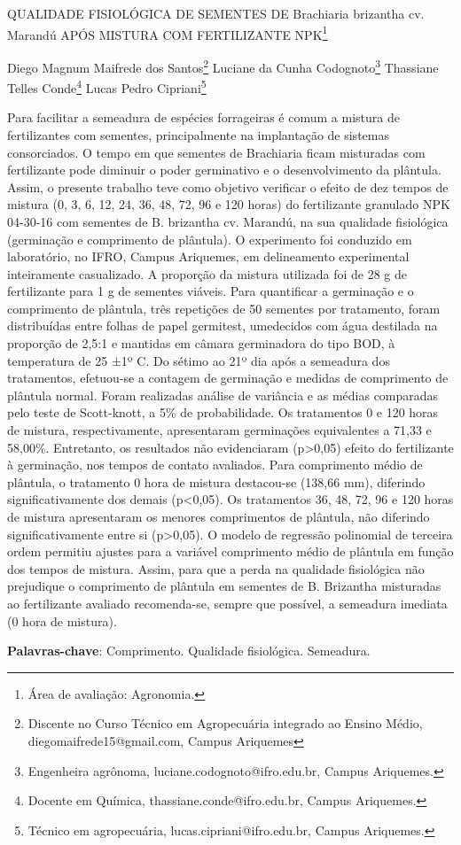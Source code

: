 \documentclass[article,12pt,onesidea,4paper,english,brazil]{abntex2}
\begin{document}
	
	
	\frenchspacing 
	
	\begin{center}
		\LARGE QUALIDADE FISIOLÓGICA DE SEMENTES DE Brachiaria brizantha cv. Marandú APÓS MISTURA COM FERTILIZANTE NPK\footnote{Área de avaliação: Agronomia.}
		
		\normalsize
	Diego Magnum Maifrede dos Santos\footnote{Discente no Curso Técnico em Agropecuária integrado ao Ensino Médio, diegomaifrede15@gmail.com, Campus Ariquemes} 
	Luciane da Cunha Codognoto\footnote{Engenheira agrônoma, luciane.codognoto@ifro.edu.br, Campus Ariquemes.} 
		Thassiane Telles Conde\footnote{Docente em Química, thassiane.conde@ifro.edu.br, Campus Ariquemes.} 
	Lucas Pedro Cipriani\footnote{Técnico em agropecuária, lucas.cipriani@ifro.edu.br, Campus Ariquemes.} 
	\end{center}
	
	\noindent Para facilitar a semeadura de espécies forrageiras é comum a mistura de fertilizantes com sementes, principalmente na implantação de sistemas consorciados. O tempo em que sementes de Brachiaria ficam misturadas com fertilizante pode diminuir o poder germinativo e o desenvolvimento da plântula. Assim, o presente trabalho teve como objetivo verificar o efeito de dez tempos de mistura (0, 3, 6, 12, 24, 36, 48, 72, 96 e 120 horas) do fertilizante granulado NPK 04-30-16 com sementes de B. brizantha cv. Marandú, na sua qualidade fisiológica (germinação e comprimento de plântula). O experimento foi conduzido em laboratório, no IFRO, Campus Ariquemes, em delineamento experimental inteiramente casualizado. A proporção da mistura utilizada foi de 28 g de fertilizante para 1 g de sementes viáveis. Para quantificar a germinação e o comprimento de plântula, três repetições de 50 sementes por tratamento, foram distribuídas entre folhas de papel germitest, umedecidos com água destilada na proporção de 2,5:1 e mantidas em câmara germinadora do tipo BOD, à temperatura de 25 ±1º C. Do sétimo ao 21º dia após a semeadura dos tratamentos, efetuou-se a contagem de germinação e medidas de comprimento de plântula normal. Foram realizadas análise de variância e as médias comparadas pelo teste de Scott-knott, a 5\% de probabilidade. Os tratamentos 0 e 120 horas de mistura, respectivamente, apresentaram germinações equivalentes a 71,33 e 58,00\%. Entretanto, os resultados não evidenciaram (p>0,05) efeito do fertilizante à germinação, nos tempos de contato avaliados. Para comprimento médio de plântula, o tratamento 0 hora de mistura destacou-se (138,66 mm), diferindo significativamente dos demais (p<0,05). Os tratamentos 36, 48, 72, 96 e 120 horas de mistura apresentaram os menores comprimentos de plântula, não diferindo significativamente entre si (p>0,05). O modelo de regressão polinomial de terceira ordem permitiu ajustes para a variável comprimento médio de plântula em função dos tempos de mistura. Assim, para que a perda na qualidade fisiológica não prejudique o comprimento de plântula em sementes de B. Brizantha misturadas ao fertilizante avaliado recomenda-se, sempre que possível, a semeadura imediata (0 hora de mistura).  
	
	\vspace{\onelineskip}
	
	\noindent
	\textbf{Palavras-chave}: Comprimento. Qualidade fisiológica. Semeadura.
	
\end{document}
